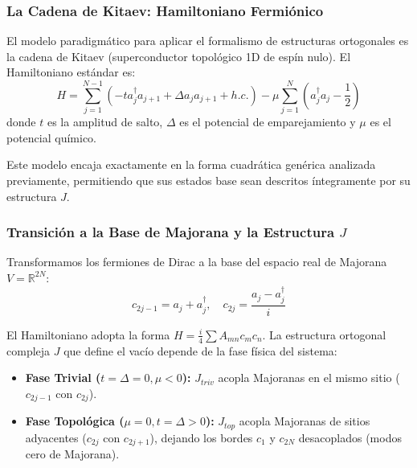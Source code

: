 
\begin{frame}
  \frametitle{La Cadena de Kitaev: Hamiltoniano Fermiónico}

  El modelo paradigmático para aplicar el formalismo de estructuras ortogonales es la cadena de Kitaev (superconductor topológico 1D de espín nulo). El Hamiltoniano estándar es:
  \begin{equation}
      H = \sum_{j=1}^{N-1} \left( -t a_j^{\dagger} a_{j+1} + \Delta a_j a_{j+1} + h.c. \right) - \mu \sum_{j=1}^N \left( a_j^{\dagger} a_j - \frac{1}{2} \right)
  \end{equation}
  donde $t$ es la amplitud de salto, $\Delta$ es el potencial de emparejamiento y $\mu$ es el potencial químico.

  \vspace{0.3cm}
  Este modelo encaja exactamente en la forma cuadrática genérica analizada previamente, permitiendo que sus estados base sean descritos íntegramente por su estructura $J$.
\end{frame}

\begin{frame}
  \frametitle{Transición a la Base de Majorana y la Estructura $J$}

  Transformamos los fermiones de Dirac a la base del espacio real de Majorana $V = \mathbb{R}^{2N}$:
  \begin{equation}
      c_{2j-1} = a_j + a_j^{\dagger}, \quad c_{2j} = \frac{a_j - a_j^{\dagger}}{i}
  \end{equation}

  El Hamiltoniano adopta la forma $H = \frac{i}{4} \sum A_{mn} c_m c_n$. La estructura ortogonal compleja $J$ que define el vacío depende de la fase física del sistema:

  \begin{itemize}
      \item \textbf{Fase Trivial ($t=\Delta=0, \mu < 0$):} $J_{triv}$ acopla Majoranas en el mismo sitio ($c_{2j-1}$ con $c_{2j}$).
      \item \textbf{Fase Topológica ($\mu=0, t=\Delta > 0$):} $J_{top}$ acopla Majoranas de sitios adyacentes ($c_{2j}$ con $c_{2j+1}$), dejando los bordes $c_1$ y $c_{2N}$ desacoplados (modos cero de Majorana).
  \end{itemize}
\end{frame}

